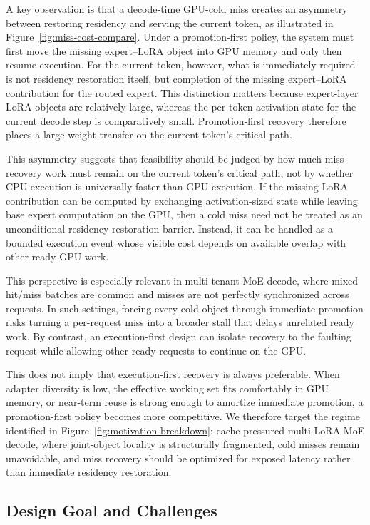 \documentclass[sigplan,anonymous,review,10pt]{acmart}
\begin{document}
A key observation is that a decode-time GPU-cold miss creates an asymmetry between restoring residency and serving the current token, as illustrated in Figure~\ref{fig:miss-cost-compare}. Under a promotion-first policy, the system must first move the missing expert--LoRA object into GPU memory and only then resume execution. For the current token, however, what is immediately required is not residency restoration itself, but completion of the missing expert--LoRA contribution for the routed expert. This distinction matters because expert-layer LoRA objects are relatively large, whereas the per-token activation state for the current decode step is comparatively small. Promotion-first recovery therefore places a large weight transfer on the current token's critical path.

This asymmetry suggests that feasibility should be judged by how much miss-recovery work must remain on the current token's critical path, not by whether CPU execution is universally faster than GPU execution. If the missing LoRA contribution can be computed by exchanging activation-sized state while leaving base expert computation on the GPU, then a cold miss need not be treated as an unconditional residency-restoration barrier. Instead, it can be handled as a bounded execution event whose visible cost depends on available overlap with other ready GPU work.

This perspective is especially relevant in multi-tenant MoE decode, where mixed hit/miss batches are common and misses are not perfectly synchronized across requests. In such settings, forcing every cold object through immediate promotion risks turning a per-request miss into a broader stall that delays unrelated ready work. By contrast, an execution-first design can isolate recovery to the faulting request while allowing other ready requests to continue on the GPU.

This does not imply that execution-first recovery is always preferable. When adapter diversity is low, the effective working set fits comfortably in GPU memory, or near-term reuse is strong enough to amortize immediate promotion, a promotion-first policy becomes more competitive. We therefore target the regime identified in Figure~\ref{fig:motivation-breakdown}: cache-pressured multi-LoRA MoE decode, where joint-object locality is structurally fragmented, cold misses remain unavoidable, and miss recovery should be optimized for exposed latency rather than immediate residency restoration.

\subsection{Design Goal and Challenges}
\label{subsec:challenges}
\end{document}
